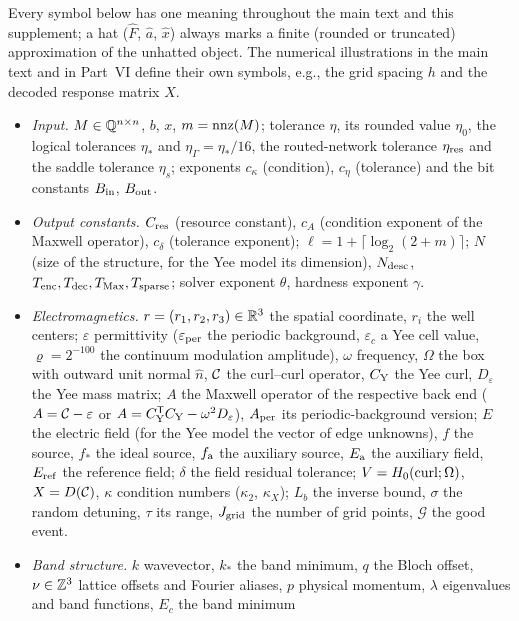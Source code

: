Every symbol below has one meaning throughout the main text and this
supplement; a hat ($\widehat F$, $\widehat a$, $\widehat x$) always marks a finite
(rounded or truncated) approximation of the unhatted object. The numerical
illustrations in the main text and in Part~VI define their own symbols, e.g.,
the grid spacing $h$ and the decoded response matrix $X$.
\begin{itemize}
\item \emph{Input.} $M\in\mathbb Q^{n\times n}$, $b$, $x$, $m=\operatorname{nnz}(M)$; tolerance
$\eta$, its rounded value $\eta_0$, the logical tolerances $\eta_*$ and
$\eta_\Gamma=\eta_*/16$, the routed-network tolerance $\eta_{\rm res}$ and the
saddle tolerance $\eta_s$; exponents $c_\kappa$ (condition), $c_\eta$
(tolerance) and the bit constants $B_{\rm in}$, $B_{\rm out}$.
\item \emph{Output constants.} $C_{\rm res}$ (resource constant), $c_A$
(condition exponent of the Maxwell operator), $c_\delta$ (tolerance
exponent); $\ell=1+\lceil\log_2(2+m)\rceil$; $N$ (size of the structure, for
the Yee model its dimension), $N_{\rm desc}$, $T_{\rm enc},T_{\rm dec},T_{\rm Max},T_{\rm sparse}$;
solver exponent $\theta$, hardness exponent $\gamma$.
\item \emph{Electromagnetics.} $r=(r_1,r_2,r_3)\in\mathbb R^3$ the spatial coordinate, $r_i$ the well centers; $\varepsilon$ permittivity ($\varepsilon_{\rm per}$ the
periodic background, $\varepsilon_c$ a Yee cell value, $\varrho=2^{-100}$ the
continuum modulation amplitude), $\omega$ frequency, $\Omega$ the box with
outward unit normal $\hat n$, $\mathcal C$ the curl--curl operator, $C_{\rm Y}$ the Yee
curl, $D_\varepsilon$ the Yee mass matrix; $A$ the Maxwell operator of the
respective back end ($A=\mathcal C-\varepsilon$ or $A=C_{\rm Y}^{\mathsf T}C_{\rm Y}-\omega^2D_\varepsilon$),
$A_{\rm per}$ its periodic-background version; $E$ the electric field (for the
Yee model the vector of edge unknowns), $f$ the source, $f_*$ the ideal source,
$f_{\rm a}$ the auxiliary source, $E_{\rm a}$ the auxiliary field, $E_{\rm ref}$ the
reference field; $\delta$ the field residual tolerance; $V=H_0(\operatorname{curl};\Omega)$,
$X=D(\mathcal C)$, $\kappa$ condition numbers ($\kappa_2$, $\kappa_X$); $L_b$ the
inverse bound, $\sigma$ the random detuning, $\tau$ its range, $J_{\rm grid}$
the number of grid points, $\mathcal G$ the good event.
\item \emph{Band structure.} $k$ wavevector, $k_*$ the band minimum, $q$ the
Bloch offset, $\nu\in\mathbb Z^3$ lattice offsets and Fourier aliases, $p$ physical
momentum, $\lambda$ eigenvalues and band functions, $E_c$ the band minimum

\end{itemize}
